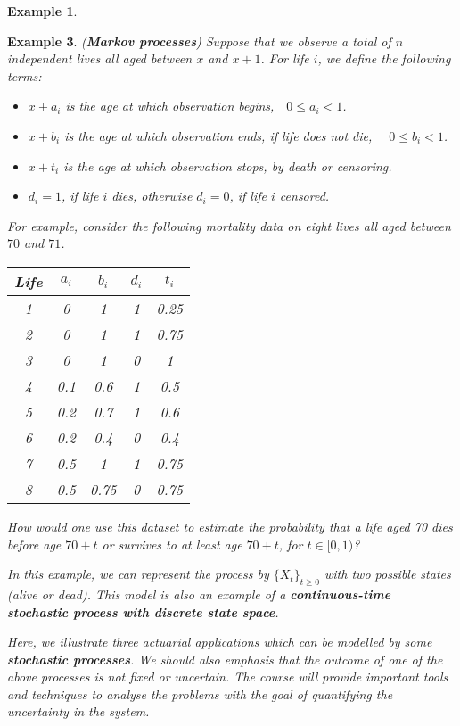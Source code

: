 \documentclass[
]{book}
\theoremstyle{definition}
\theoremstyle{definition}
\newtheorem{example}{Example}[chapter]
\theoremstyle{definition}
\theoremstyle{definition}
\theoremstyle{remark}
\begin{document}
\begin{example}
\protect\hypertarget{exm:unlabeled-div-3}{}\label{exm:unlabeled-div-3}

\textbf{Example 3}. \emph{(\textbf{Markov processes}) Suppose that we observe a total
of \(n\) independent lives all aged between \(x\) and \(x + 1\). For life \(i\),
we define the following terms:}

\begin{itemize}
\item
  \emph{\(x+ a_i\) is the age at which observation
  begins,\(\quad 0 \le a_i < 1\).}
\item
  \emph{\(x+ b_i\) is the age at which observation ends, if life does not
  die, \(\quad 0 \le b_i < 1\).}
\item
  \emph{\(x+ t_i\) is the age at which observation stops, by death or
  censoring.}
\item
  \emph{\(d_i = 1\), if life \(i\) dies, otherwise \(d_i = 0\), if life \(i\)
  censored.}
\end{itemize}

\emph{For example, consider the following mortality data on eight lives all
aged between \(70\) and \(71\).}

\begin{longtable}[]{@{}ccccc@{}}
\toprule
\emph{Life} & \emph{\(a_i\)} & \emph{\(b_i\)} & \emph{\(d_i\)} & \emph{\(t_i\)} \\
\midrule
\endhead
\emph{1} & \emph{0} & \emph{1} & \emph{1} & \emph{0.25} \\
\emph{2} & \emph{0} & \emph{1} & \emph{1} & \emph{0.75} \\
\emph{3} & \emph{0} & \emph{1} & \emph{0} & \emph{1} \\
\emph{4} & \emph{0.1} & \emph{0.6} & \emph{1} & \emph{0.5} \\
\emph{5} & \emph{0.2} & \emph{0.7} & \emph{1} & \emph{0.6} \\
\emph{6} & \emph{0.2} & \emph{0.4} & \emph{0} & \emph{0.4} \\
\emph{7} & \emph{0.5} & \emph{1} & \emph{1} & \emph{0.75} \\
\emph{8} & \emph{0.5} & \emph{0.75} & \emph{0} & \emph{0.75} \\
\bottomrule
\end{longtable}

\emph{How would one use this dataset to estimate the probability that a life
aged 70 dies before age \(70 + t\) or survives to at least age \(70 + t\),
for \(t \in [0,1)\)?}

\emph{In this example, we can represent the process by \(\{X_t\}_{t \ge 0}\)
with two possible states (alive or dead). This model is also an example
of a \textbf{continuous-time stochastic process with discrete state space}.}

\emph{Here, we illustrate three actuarial applications which can be modelled
by some \textbf{stochastic processes}. We should also emphasis that the
outcome of one of the above processes is not fixed or uncertain. The
course will provide important tools and techniques to analyse the
problems with the goal of quantifying the uncertainty in the system.}

\end{example}
\end{document}
